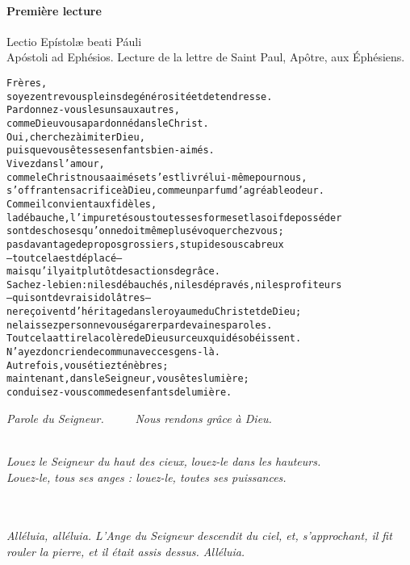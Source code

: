 \documentclass[twoside]{article}
\begin{document}
\paragraph{Première lecture}

\begin{paracol}{2}
Lectio Epístolæ beati Páuli \\ Apóstoli ad Ephésios.
\switchcolumn
Lecture de la lettre de Saint Paul, Apôtre, aux Éphésiens.
\end{paracol}
\begin{alltt}\normalfont
    Frères,
        soyez entre vous pleins de générosité et de tendresse.
    Pardonnez-vous les uns aux autres,
        comme Dieu vous a pardonné dans le Christ.
    Oui, cherchez à imiter Dieu,
        puisque vous êtes ses enfants bien-aimés.
    Vivez dans l’amour,
        comme le Christ nous a aimés et s’est livré lui-même pour nous,
        s’offrant en sacrifice à Dieu, comme un parfum d’agréable odeur.
    Comme il convient aux fidèles,
        la débauche, l’impureté sous toutes ses formes et la soif de posséder
        sont des choses qu’on ne doit même plus évoquer chez vous ;
    pas davantage de propos grossiers, stupides ou scabreux
        – tout cela est déplacé –
        mais qu’il y ait plutôt des actions de grâce.
    Sachez-le bien : ni les débauchés, ni les dépravés, ni les profiteurs
        – qui sont de vrais idolâtres –
        ne reçoivent d’héritage dans le royaume du Christ et de Dieu ;
        ne laissez personne vous égarer par de vaines paroles.
    Tout cela attire la colère de Dieu sur ceux qui désobéissent.
        N’ayez donc rien de commun avec ces gens-là.
    Autrefois, vous étiez ténèbres ;
        maintenant, dans le Seigneur, vous êtes lumière ;
        conduisez-vous comme des enfants de lumière.
\end{alltt}


\emph{\vv Parole du Seigneur. ~~~~ \rr Nous rendons grâce à Dieu.}


\\
\emph{\rr Louez le Seigneur du haut des cieux, louez-le dans les hauteurs.\\
\vv Louez-le, tous ses anges : louez-le, toutes ses puissances.}\\
~\\

\\
\emph{Alléluia, alléluia. L’Ange du Seigneur descendit du ciel, et, s’approchant, il fit rouler la pierre, et il était assis dessus. Alléluia.}
\end{document}
